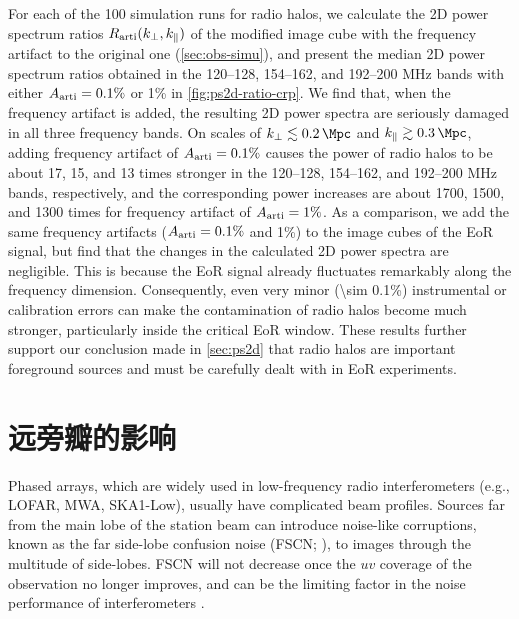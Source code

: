 For each of the 100 simulation runs for radio halos, we calculate the
2D power spectrum ratios $R_{\mathrm{arti}}(k_{\perp}, k_{\parallel})$ of the modified
image cube with the frequency artifact to the original one
(\autoref{sec:obs-simu}),
and present the median 2D power spectrum ratios obtained in the
\numrange{120}{128}, \numrange{154}{162}, and \numrange{192}{200}
\si{\MHz} bands with either $A_{\mathrm{arti}} = 0.1\%$ or 1\% in
\autoref{fig:ps2d-ratio-crp}.
We find that, when the frequency artifact is added, the resulting 2D
power spectra are seriously damaged in all three frequency bands.
On scales of $\kperp \lesssim \SI{0.2}{\per\Mpc}$ and
$\klos \gtrsim \SI{0.3}{\per\Mpc}$,
adding frequency artifact of $A_{\mathrm{arti}} = 0.1\%$
causes the power of radio halos to be about 17, 15, and 13 times
stronger in the \numrange{120}{128},
\numrange{154}{162}, and \numrange{192}{200} \si{\MHz} bands,
respectively, and the corresponding power increases are about
1700, 1500, and 1300 times
for frequency artifact of $A_{\mathrm{arti}} = 1\%$.
As a comparison, we add the same frequency artifacts
($A_{\mathrm{arti}} = 0.1\%$ and 1\%) to the image
cubes of the EoR signal, but find that the changes in the calculated
2D power spectra are negligible.
This is because the EoR signal already fluctuates remarkably along
the frequency dimension.
Consequently, even very minor (\num{\sim 0.1}\%) instrumental or
calibration errors can make the contamination of radio halos
become much stronger, particularly inside the critical EoR window.
These results further support our conclusion made in \autoref{sec:ps2d}
that radio halos are important foreground sources and must be carefully
dealt with in EoR experiments.


\section{远旁瓣的影响}
\label{sec:fscn}

Phased arrays, which are widely used in low-frequency radio
interferometers (e.g., LOFAR, MWA, SKA1-Low), usually have complicated
beam profiles.
Sources far from the main lobe of the station beam can introduce
noise-like corruptions, known as the far side-lobe confusion noise
(FSCN; ), to images through the multitude of
side-lobes.
FSCN will not decrease once the $uv$ coverage of the observation no
longer improves, and can be the limiting factor in the noise
performance of interferometers \cite{mort2017}.

